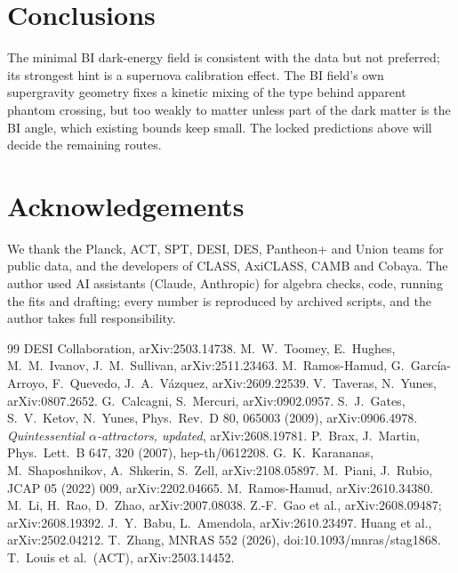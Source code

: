 \documentclass[11pt]{article}
\begin{document}
\section{Conclusions}
The minimal BI dark-energy field is consistent with the data but not preferred; its strongest hint is a supernova
calibration effect. The BI field's own supergravity geometry fixes a kinetic mixing of the type behind apparent phantom
crossing, but too weakly to matter unless part of the dark matter is the BI angle, which existing bounds keep small.
The locked predictions above will decide the remaining routes.

\section*{Acknowledgements}
We thank the Planck, ACT, SPT, DESI, DES, Pantheon+ and Union teams for public data, and the developers of CLASS,
AxiCLASS, CAMB and Cobaya. The author used AI assistants (Claude, Anthropic) for algebra checks, code, running the fits
and drafting; every number is reproduced by archived scripts, and the author takes full responsibility.

\begin{thebibliography}{99}
 DESI Collaboration, arXiv:2503.14738.
 M.~W.~Toomey, E.~Hughes, M.~M.~Ivanov, J.~M.~Sullivan, arXiv:2511.23463.
 M.~Ramos-Hamud, G.~Garc\'ia-Arroyo, F.~Quevedo, J.~A.~V\'azquez, arXiv:2609.22539.
 V.~Taveras, N.~Yunes, arXiv:0807.2652.
 G.~Calcagni, S.~Mercuri, arXiv:0902.0957.
 S.~J.~Gates, S.~V.~Ketov, N.~Yunes, Phys.\ Rev.\ D 80, 065003 (2009), arXiv:0906.4978.
 \emph{Quintessential $\alpha$-attractors, updated}, arXiv:2608.19781.
 P.~Brax, J.~Martin, Phys.\ Lett.\ B 647, 320 (2007), hep-th/0612208.
 G.~K.~Karananas, M.~Shaposhnikov, A.~Shkerin, S.~Zell, arXiv:2108.05897.
 M.~Piani, J.~Rubio, JCAP 05 (2022) 009, arXiv:2202.04665.
 M.~Ramos-Hamud, arXiv:2610.34380.
 M.~Li, H.~Rao, D.~Zhao, arXiv:2007.08038.
 Z.-F.~Gao et al., arXiv:2608.09487; arXiv:2608.19392.
 J.~Y.~Babu, L.~Amendola, arXiv:2610.23497.
 Huang et al., arXiv:2502.04212.
 T.~Zhang, MNRAS 552 (2026), doi:10.1093/mnras/stag1868.
 T.~Louis et al.\ (ACT), arXiv:2503.14452.
\end{thebibliography}
\end{document}
